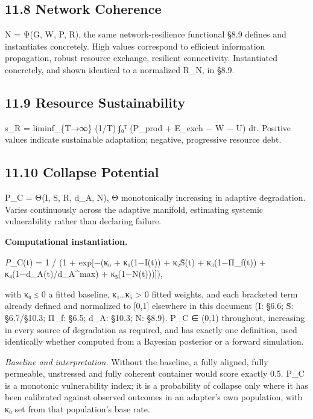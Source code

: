 \documentclass[
]{article}
\begin{document}
\hypertarget{network-coherence}{%
\subsection{11.8 Network Coherence}\label{network-coherence}}

N = Ψ(G, W, P, R), the same network-resilience functional §8.9 defines
and instantiates concretely. High values correspond to efficient
information propagation, robust resource exchange, resilient
connectivity. Instantiated concretely, and shown identical to a
normalized R\_N, in §8.9.

\hypertarget{resource-sustainability}{%
\subsection{11.9 Resource
Sustainability}\label{resource-sustainability}}

s\_R = liminf\_\{T→∞\} (1/T) ∫₀ᵀ (P\_prod + E\_exch − W − U) dt.
Positive values indicate sustainable adaptation; negative, progressive
resource debt.

\hypertarget{collapse-potential}{%
\subsection{11.10 Collapse Potential}\label{collapse-potential}}

P\_C = Θ(I, S, R, d\_A, N), Θ monotonically increasing in adaptive
degradation. Varies continuously across the adaptive manifold,
estimating systemic vulnerability rather than declaring failure.

\textbf{Computational instantiation.}

\emph{P}\_C(t) = 1 / (1 + exp{[}−(κ₀ + κ₁(1−I(t)) + κ₂S̃(t) +
κ₃(1−Π\_f(t)) + κ₄(1−d\_A(t)/d\_A\^{}max) + κ₅(1−N(t))){]}),

with κ₀ ≤ 0 a fitted baseline, κ₁\ldots κ₅ \textgreater{} 0 fitted
weights, and each bracketed term already defined and normalized to
{[}0,1{]} elsewhere in this document (I: §6.6; S̃: §6.7/§10.3; Π\_f:
§6.5; d\_A: §10.3; N: §8.9). P\_C ∈ (0,1) throughout, increasing in
every source of degradation as required, and has exactly one definition,
used identically whether computed from a Bayesian posterior or a forward
simulation.

\emph{Baseline and interpretation.} Without the baseline, a fully
aligned, fully permeable, unstressed and fully coherent container would
score exactly 0.5. P\_C is a monotonic vulnerability index; it is a
probability of collapse only where it has been calibrated against
observed outcomes in an adapter's own population, with κ₀ set from that
population's base rate.
\end{document}
